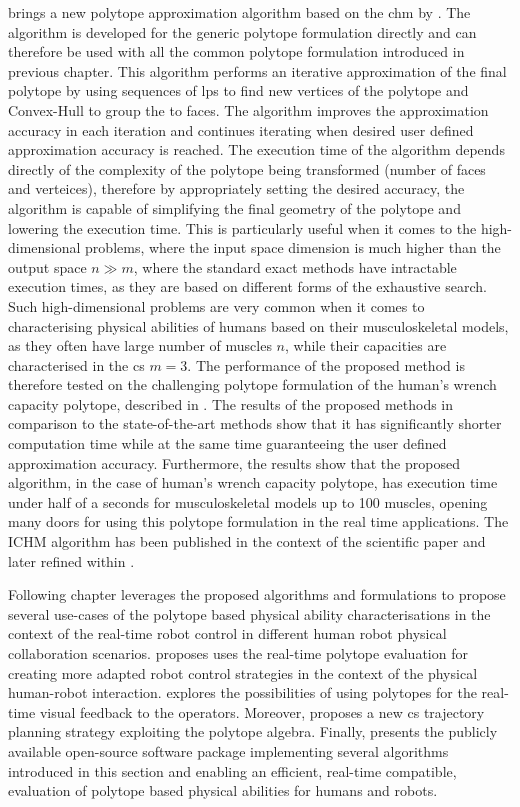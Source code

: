  brings a new polytope approximation algorithm based on the \gls{chm} by \citet{lassez1992quantifier}. The algorithm is developed for the generic polytope formulation directly and can therefore be used with all the common polytope formulation introduced in previous chapter. This algorithm performs an iterative approximation of the final polytope by using sequences of \glspl{lp} to find new vertices of the polytope and Convex-Hull to group the to faces. The algorithm improves the approximation accuracy in each iteration and continues iterating when desired user defined approximation accuracy is reached. The execution time of the algorithm depends directly of the complexity of the polytope being transformed (number of faces and verteices), therefore by appropriately setting the desired accuracy, the algorithm is capable of simplifying the final geometry of the polytope and lowering the execution time. This is particularly useful when it comes to the high-dimensional problems, where the input space dimension is much higher than the output space $n\!\gg \!m$, where the standard exact methods have intractable execution times, as they are based on different forms of the exhaustive search. Such high-dimensional problems are very common when it comes to characterising physical abilities of humans based on their musculoskeletal models, as they often have large number of muscles $n$, while their capacities are characterised in the \gls{cs} $m=3$. The performance of the proposed method is therefore tested on the challenging polytope formulation of the human's wrench capacity polytope, described in . The results of the proposed methods in comparison to the state-of-the-art methods show that it has significantly shorter computation time while at the same time guaranteeing the user defined approximation accuracy. Furthermore, the results show that the proposed algorithm, in the case of human's wrench capacity polytope, has execution time under half of a seconds for musculoskeletal models up to 100 muscles, opening many doors for using this polytope formulation in the real time applications. The ICHM algorithm has been published in the context of the scientific paper \citet{Skuric2022human} and later refined within \citet{skuric2023dynamics}.

Following chapter leverages the proposed algorithms and formulations to propose several use-cases of the polytope based physical ability characterisations in the context of the real-time robot control in different human robot physical collaboration scenarios. 
 proposes uses the real-time polytope evaluation for creating more adapted robot control strategies in the context of the physical human-robot interaction. 
 explores the possibilities of using polytopes for the real-time visual feedback to the operators. Moreover,  proposes a new \gls{cs} trajectory planning strategy exploiting the polytope algebra. Finally,  presents the publicly available open-source software package implementing several algorithms introduced in this section and enabling an efficient, real-time compatible, evaluation of polytope based physical abilities for humans and robots.
